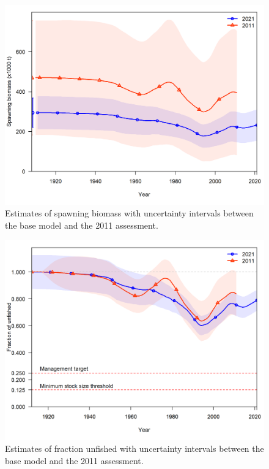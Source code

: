 \documentclass[11pt,
  english,
  a4paper,
]{article}
\begin{document}

\begin{figure}
\centering
\includegraphics[width=1\textwidth,height=1\textheight]{figs/2021_2011_compare2_spawnbio_uncertainty.png}
\caption{Estimates of spawning biomass with uncertainty intervals between the base model and the 2011 assessment.\label{fig:ssb-2011-2021}}
\end{figure}

\tagmcend\tagstructend


\begin{figure}
\centering
\includegraphics[width=1\textwidth,height=1\textheight]{figs/2021_2011_compare4_Bratio_uncertainty.png}
\caption{Estimates of fraction unfished with uncertainty intervals between the base model and the 2011 assessment.\label{fig:depl-2011-2021}}
\end{figure}
\end{document}
